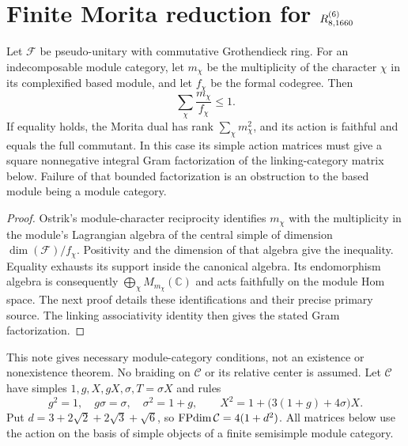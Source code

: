 \section{Finite Morita reduction for \texorpdfstring{$R^{(6)}_{8,1660}$}{R6\_8\_1660}}\label{sec:1660-morita-reduction}
\begin{proposition}
Let $\mathcal F$ be pseudo-unitary with commutative Grothendieck ring.
For an indecomposable module category, let $m_\chi$ be the multiplicity
of the character $\chi$ in its complexified based module, and let
$f_\chi$ be the formal codegree. Then
\[
 \sum_\chi\frac{m_\chi}{f_\chi}\leq1.
\]
If equality holds, the Morita dual has rank $\sum_\chi m_\chi^2$,
and its action is faithful and equals the full commutant. In this
case its simple action matrices must give a square nonnegative
integral Gram factorization of the linking-category matrix below.
Failure of that bounded factorization is an obstruction to the based
module being a module category.
\end{proposition}
\begin{proof}
Ostrik's module-character reciprocity identifies $m_\chi$ with the
multiplicity in the module's Lagrangian algebra of the central simple
of dimension $\dim(\mathcal F)/f_\chi$. Positivity and the dimension
of that algebra give the inequality. Equality exhausts its support
inside the canonical algebra. Its endomorphism algebra is consequently
$\bigoplus_\chi M_{m_\chi}(\mathbb C)$ and acts faithfully on the
module Hom space. The next proof details these identifications and
their precise primary source. The linking associativity identity then
gives the stated Gram factorization.
\end{proof}

This note gives necessary module-category conditions, not an existence or
nonexistence theorem. No braiding on $\mathcal C$ or its relative center is assumed.
Let $\mathcal C$ have simples $1,g,X,gX,\sigma,T=\sigma X$ and rules
\[
g^2=1,\quad g\sigma=\sigma,\quad\sigma^2=1+g,\qquad
X^2=1+\bigl(3(1+g)+4\sigma\bigr)X.
\]
Put $d=3+2\sqrt2+2\sqrt3+\sqrt6$, so $\operatorname{FPdim}\mathcal C=4(1+d^2)$.
All matrices below use the action on the basis of simple objects of a
finite semisimple module category.

